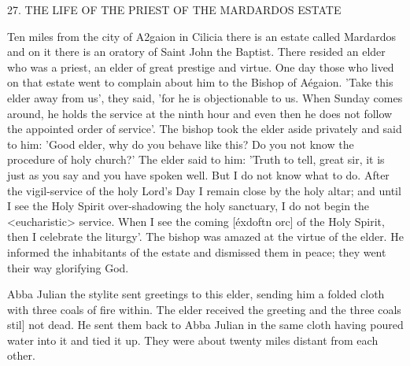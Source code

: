 27.
THE LIFE OF THE PRIEST OF THE
MARDARDOS ESTATE

Ten miles from the city of A2gaion in Cilicia there is an estate called
Mardardos and on it there is an oratory of Saint John the Baptist.
There resided an elder who was a priest, an elder of great prestige
and virtue.
One day those who lived on that estate went to complain
about him to the Bishop of Aégaion.
'Take this elder away from us',
they said, 'for he is objectionable to us.
When Sunday comes
around, he holds the service at the ninth hour and even then he
does not follow the appointed order of service'.
The bishop took the
elder aside privately and said to him: 'Good elder, why do you
behave like this? Do you not know the procedure of holy church?'
The elder said to him: 'Truth to tell, great sir, it is just as you say
and you have spoken well.
But I do not know what to do.
After the
vigil-service of the holy Lord's Day I remain close by the holy altar;
and until I see the Holy Spirit over-shadowing the holy sanctuary,
I do not begin the <eucharistic> service.
When I see the coming
[éxdoftn orc] of the Holy Spirit, then I celebrate the liturgy'.
The bishop was amazed at the virtue of the elder.
He informed the
inhabitants of the estate and dismissed them in peace; they went
their way glorifying God.

Abba Julian the stylite sent greetings to this elder, sending him
a folded cloth with three coals of fire within.
The elder received the
greeting and the three coals stil] not dead.
He sent them back to
Abba Julian in the same cloth having poured water into it and tied
it up.
They were about twenty miles distant from each other.

